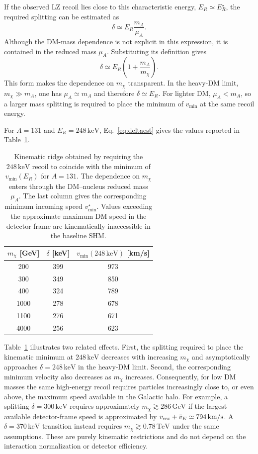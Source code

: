 \documentclass[aps,prd,reprint,superscriptaddress,nofootinbib,longbibliography,floatfix]{revtex4-2}
\newcommand{\GeV}{\mathrm{GeV}}
\newcommand{\TeV}{\mathrm{TeV}}
\newcommand{\keV}{\mathrm{keV}}
\begin{document}
If the observed LZ recoil lies close to this characteristic energy, $E_R\simeq E_R^\star$, the required splitting can be estimated as
\begin{equation}
\delta\simeq E_R\frac{m_A}{\mu_A}.
\label{eq:deltaest}
\end{equation}
Although the DM-mass dependence is not explicit in this expression, it is contained in the reduced mass $\mu_A$. Substituting its definition gives
\begin{equation}
\delta\simeq E_R\left(1+\frac{m_A}{m_\chi}\right).
\label{eq:deltaestexplicit}
\end{equation}
This form makes the dependence on $m_\chi$ transparent. In the heavy-DM limit, $m_\chi\gg m_A$, one has $\mu_A\simeq m_A$ and therefore $\delta\simeq E_R$. For lighter DM, $\mu_A<m_A$, so a larger mass splitting is required to place the minimum of $v_{\min}$ at the same recoil energy.

For $A=131$ and $E_R=248\,\keV$, Eq.~\eqref{eq:deltaest} gives the values reported in Table~\ref{tab:kinematics}.

\begin{table}[b]
\caption{Kinematic ridge obtained by requiring the $248\,\keV$ recoil to coincide with the minimum of $v_{\min}(E_R)$ for $A=131$. The dependence on $m_\chi$ enters through the DM--nucleus reduced mass $\mu_A$. The last column gives the corresponding minimum incoming speed $v_{\min}^{\star}$. Values exceeding the approximate maximum DM speed in the detector frame are kinematically inaccessible in the baseline SHM.}
\label{tab:kinematics}
\begin{ruledtabular}
\begin{tabular}{ccc}
$m_\chi$ [GeV] & $\delta$ [keV] & $v_{\min}(248\,\keV)$ [km/s]\\
\hline
200  & 399 & 973\\
300  & 349 & 850\\
400  & 324 & 789\\
1000 & 278 & 678\\
1100 & 276 & 671\\
4000 & 256 & 623\\
\end{tabular}
\end{ruledtabular}
\end{table}

Table~\ref{tab:kinematics} illustrates two related effects. First, the splitting required to place the kinematic minimum at $248\,\keV$ decreases with increasing $m_\chi$ and asymptotically approaches $\delta=248\,\keV$ in the heavy-DM limit. Second, the corresponding minimum velocity also decreases as $m_\chi$ increases. Consequently, for low DM masses the same high-energy recoil requires particles increasingly close to, or even above, the maximum speed available in the Galactic halo. For example, a splitting $\delta=300\,\keV$ requires approximately $m_\chi\gtrsim286\,\GeV$ if the largest available detector-frame speed is approximated by $v_{\rm esc}+\bar v_E\simeq794\,\mathrm{km/s}$. A $\delta=370\,\keV$ transition instead requires $m_\chi\gtrsim0.78\,\TeV$ under the same assumptions. These are purely kinematic restrictions and do not depend on the interaction normalization or detector efficiency.
\end{document}
